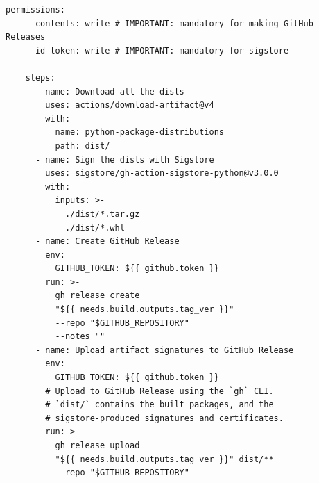 \begin{lstlisting}[caption={\texttt{workflow.yml} file for \texttt{cloudkube} release}]
    permissions:
      contents: write # IMPORTANT: mandatory for making GitHub Releases
      id-token: write # IMPORTANT: mandatory for sigstore

    steps:
      - name: Download all the dists
        uses: actions/download-artifact@v4
        with:
          name: python-package-distributions
          path: dist/
      - name: Sign the dists with Sigstore
        uses: sigstore/gh-action-sigstore-python@v3.0.0
        with:
          inputs: >-
            ./dist/*.tar.gz
            ./dist/*.whl
      - name: Create GitHub Release
        env:
          GITHUB_TOKEN: ${{ github.token }}
        run: >-
          gh release create
          "${{ needs.build.outputs.tag_ver }}"
          --repo "$GITHUB_REPOSITORY"
          --notes ""
      - name: Upload artifact signatures to GitHub Release
        env:
          GITHUB_TOKEN: ${{ github.token }}
        # Upload to GitHub Release using the `gh` CLI.
        # `dist/` contains the built packages, and the
        # sigstore-produced signatures and certificates.
        run: >-
          gh release upload
          "${{ needs.build.outputs.tag_ver }}" dist/**
          --repo "$GITHUB_REPOSITORY"

\end{lstlisting}